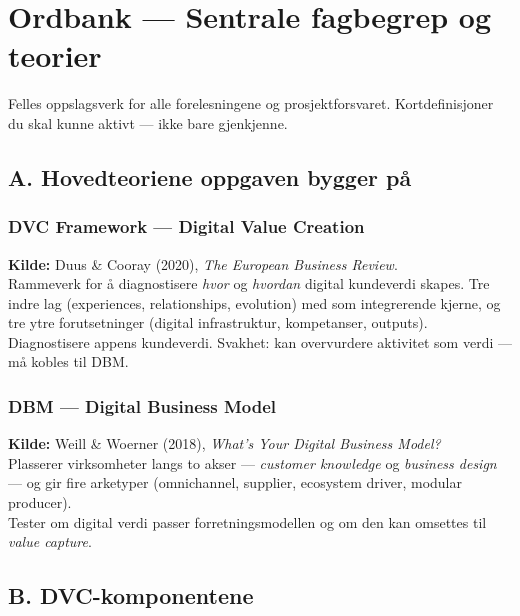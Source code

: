 \section*{Ordbank --- Sentrale fagbegrep og teorier}
\label{sec:ordbank}

Felles oppslagsverk for alle forelesningene og prosjektforsvaret.
Kortdefinisjoner du skal kunne aktivt --- ikke bare gjenkjenne.

\subsection*{A. Hovedteoriene oppgaven bygger på}

\subsubsection*{DVC Framework --- Digital Value Creation}
\textbf{Kilde:} Duus \& Cooray (2020), \emph{The European Business Review}.\\
Rammeverk for å diagnostisere \emph{hvor} og \emph{hvordan} digital kundeverdi
skapes. Tre indre lag (experiences, relationships, evolution) med
 som integrerende kjerne, og tre ytre forutsetninger (digital
infrastruktur, kompetanser, outputs).\\
 Diagnostisere appens kundeverdi. Svakhet: kan overvurdere
aktivitet som verdi --- må kobles til DBM.

\subsubsection*{DBM --- Digital Business Model}
\textbf{Kilde:} Weill \& Woerner (2018), \emph{What's Your Digital Business
Model?}\\
Plasserer virksomheter langs to akser --- \emph{customer knowledge} og
\emph{business design} --- og gir fire arketyper (omnichannel, supplier,
ecosystem driver, modular producer).\\
 Tester om digital verdi passer forretningsmodellen og om den
kan omsettes til \emph{value capture}.

\subsection*{B. DVC-komponentene}

